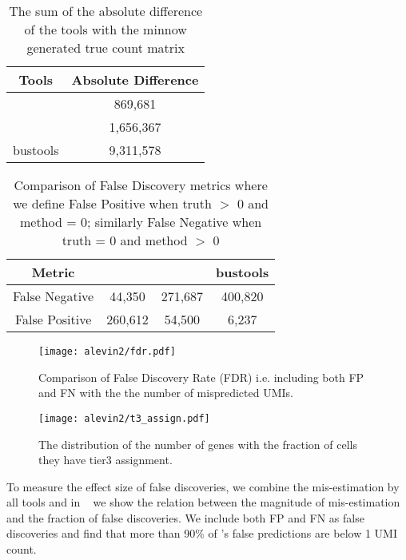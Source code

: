 \begin{table}[h!]
	\centering
	 \begin{tabular}{|| c | c||} 
		 \hline
		 Tools & Absolute Difference \\ [0.5ex] 
		 \hline\hline
		 \alevin & 869,681 \\
		 \hline
		 \cellr & 1,656,367 \\
		 \hline
		 bustools & 9,311,578 \\ [1ex] 
		 \hline
 	\end{tabular}
	\caption{The sum of the absolute difference of the tools with the minnow generated 
	true count matrix }
	\label{tab:matrix_diff}
\end{table}

\begin{table}[h!]
	\centering
	 \begin{tabular}{|| c | c | c | | c||} 
		 \hline
		 Metric & \alevin & \cellr & bustools \\ [0.5ex] 
		 \hline\hline
		 False Negative & 44,350 & 271,687 & 400,820 \\
		 \hline
		 False Positive & 260,612 & 54,500 & 6,237 \\ [1ex] 
		 \hline
 	\end{tabular}
	\caption{Comparison of False Discovery metrics where we define False Positive when truth 
	$>$ 0 and method = 0; similarly False Negative when truth = 0 and method $>$ 0}
	\label{tab:f1}
\end{table}

  \begin{figure}[!htb]
      \centering
    \texttt{[image: alevin2/fdr.pdf]}
    \caption{ Comparison of False Discovery Rate (FDR) i.e. including both FP and FN with the
	the number of mispredicted UMIs. }
    \label{fig:alv2_fdr}
  \end{figure}

  \begin{figure}[!htb]
      \centering
    \texttt{[image: alevin2/t3\_assign.pdf]}
    \caption{ The distribution of the number of genes with the fraction of cells they have tier3
	assignment.}
    \label{fig:alv2_t3}
  \end{figure}

To measure the effect size of false discoveries, we combine the mis-estimation by all tools
and in ~ we show the relation between the magnitude of mis-estimation and the fraction of 
false discoveries. We include both FP and FN as false discoveries and find that more than 90\% of \alevin 's 
false predictions are below 1 UMI count. 


